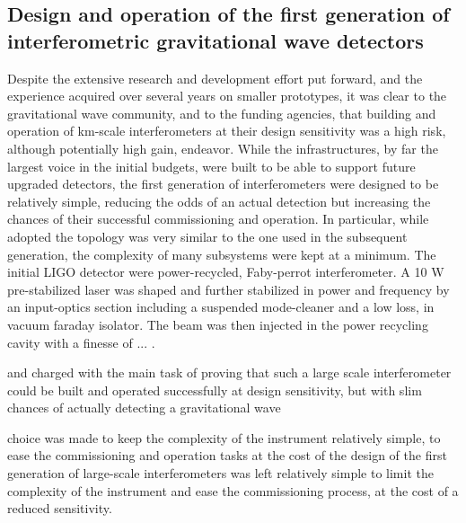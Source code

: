 \subsection{Design and operation of the first generation of interferometric gravitational wave detectors}\label{subsec:1stgen}

Despite the extensive research and development effort put forward, and the experience acquired over several years on smaller prototypes, it was clear to the gravitational wave community, and to the funding agencies, that building and operation of km-scale interferometers at their design sensitivity was a high risk, although potentially high gain, endeavor. While the infrastructures, by far the largest voice in the initial budgets, were built to be able to support future upgraded detectors, the first generation of interferometers were designed to be relatively simple, reducing the odds of an actual detection but increasing the chances of their successful commissioning and operation. In particular, while adopted the topology was very similar to the one used in the subsequent generation, the complexity of many subsystems were kept at a minimum.
The initial LIGO detector were power-recycled, Faby-perrot interferometer. A 10 W pre-stabilized laser was shaped and further stabilized in power and frequency by an input-optics section including a suspended mode-cleaner and a low loss, in vacuum faraday isolator. The beam was then injected in the power recycling cavity with a finesse of ... . 


and charged with the main task of proving that such a large scale interferometer could be built and operated successfully at design sensitivity, but with slim chances of actually detecting a gravitational wave

choice was made to keep the complexity of the instrument relatively simple, to ease the commissioning and operation tasks at the cost of 
the design of the first generation of large-scale interferometers was left relatively simple to limit the complexity of the instrument and ease the commissioning process, at the cost of a reduced sensitivity.

 

